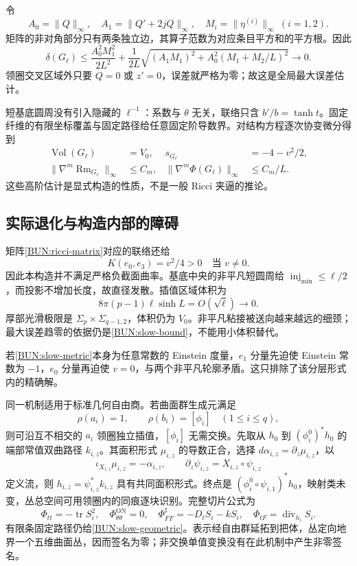 \documentclass[UTF8,fontset=fandol,zihao=-4,oneside,openany]{ctexbook}
\theoremstyle{cjkplain}
\numberwithin{equation}{chapter}
\begin{document}
令
\[
 A_0=\|Q\|_\infty,\quad A_1=\|Q'+2jQ\|_\infty,
 \quad M_i=\|\eta^{(i)}\|_\infty\ (i=1,2).
\]
矩阵的非对角部分只有两条独立边，其算子范数为对应条目平方和的平方根。因此
\begin{equation}
 \delta(G_\ell)\le
 \frac{A_0^2M_1^2}{2L^2}+
 \frac1{2L}\sqrt{(A_1M_1)^2+A_0^2(M_1+M_2/L)^2}
 \longrightarrow0.
 \label{BUN:slow-bound}
\end{equation}
领圈交叉区域外只要 $Q=0$ 或 $z'=0$，误差就严格为零；故这是全局最大误差估计。

短基底圆周没有引入隐藏的 $\ell^{-1}$：系数与 $\theta$ 无关，联络只含 $b'/b=\tanh t$。固定纤维的有限坐标覆盖与固定路径给任意固定阶导数界。对结构方程逐次协变微分得到
\begin{equation}
 \begin{aligned}
 \operatorname{Vol}(G_\ell)&=V_0, & s_{G_\ell}&=-4-v^2/2,\\
 \|\nabla^m\operatorname{Rm}_{G_\ell}\|_\infty&\le C_m,
 &\|\nabla^m\Phi(G_\ell)\|_\infty&\le C_m/L.
 \end{aligned}
 \label{BUN:slow-geometric}
\end{equation}
这些高阶估计是显式构造的性质，不是一般 Ricci 夹逼的推论。

\subsection{实际退化与构造内部的障碍}
矩阵\eqref{BUN:ricci-matrix}对应的联络还给
\begin{equation}
 K(e_0,e_3)=v^2/4>0\quad\text{当 }v\ne0.
 \label{BUN:positive-plane}
\end{equation}
因此本构造并不满足严格负截面曲率。基底中央的非平凡短圆周给 $\operatorname{inj}_{\min}\le\ell/2$，而投影不增加长度，故直径发散。插值区域体积为
\[
 8\pi(p-1)\ell\sinh L=O(\sqrt\ell)\longrightarrow0.
\]
厚部光滑极限是 $\Sigma_p\times\Sigma_{q-1,2}$，体积仍为 $V_0$。非平凡粘接被送向越来越远的细颈；最大误差趋零的依据仍是\eqref{BUN:slow-bound}，不能用小体积替代。

若\eqref{BUN:slow-metric}本身为任意常数的 Einstein 度量，$e_1$ 分量先迫使 Einstein 常数为 $-1$，$e_0$ 分量再迫使 $v=0$，与两个非平凡轮廓矛盾。这只排除了该分层形式内的精确解。

同一机制适用于标准几何自由商。若曲面群生成元满足
\[
 \rho(a_i)=1,\qquad\rho(b_i)=[\phi_i]\quad(1\le i\le q),
\]
则可沿互不相交的 $a_i$ 领圈独立插值，$[\phi_i]$ 无需交换。先取从 $h_0$ 到 $(\phi_i^0)^*h_0$ 的端部常值双曲路径 $k_{i,z}$。其面积形式 $\mu_{i,z}$ 的导数正合，选择 $d\alpha_{i,z}=\partial_z\mu_{i,z}$，以
\[
 \iota_{X_{i,z}}\mu_{i,z}=-\alpha_{i,z},\qquad
 \partial_z\psi_{i,z}=X_{i,z}\circ\psi_{i,z}
\]
定义流，则 $h_{i,z}=\psi_{i,z}^*k_{i,z}$ 具有共同面积形式。终点是 $(\phi_i^0\circ\psi_{i,1})^*h_0$，映射类未变，丛总空间可用领圈内的同痕逐块识别。完整切片公式为
\[
 \Phi_{tt}=-\operatorname{tr}S_i^2,\quad \Phi_{\theta\theta}^{\mathrm{ON}}=0,
 \quad \Phi_{FF}^{\sharp}=-D_tS_i-kS_i,
 \quad \Phi_{tF}=\operatorname{div}_{h_i}S_i.
\]
有限条固定路径仍给\eqref{BUN:slow-geometric}。表示经自由群延拓到把体，丛定向地界一个五维曲面丛，因而签名为零；非交换单值变换没有在此机制中产生非零签名。
\end{document}

